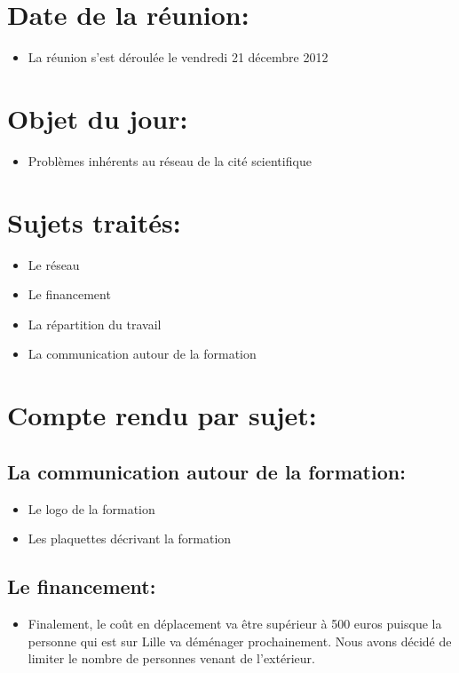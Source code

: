 \section{Date de la réunion:}
\begin{itemize}
\item La réunion s'est déroulée le vendredi 21 décembre 2012
\end{itemize}

\section{Objet du jour:}
\begin{itemize}
\item Problèmes inhérents au réseau de la cité scientifique
\end{itemize}

\section{Sujets traités:}
\begin{itemize}
\item Le réseau
\item Le financement
\item La répartition du travail
\item La communication autour de la formation
\end{itemize}

\section{Compte rendu par sujet:}

\subsection{La communication autour de la formation:}
\begin{itemize}
\item Le logo de la formation
\item Les plaquettes décrivant la formation

\end{itemize}

\subsection{Le financement:}
\begin{itemize}
\item Finalement, le coût en déplacement va être supérieur à 500 euros
puisque la personne qui est sur Lille va déménager prochainement. Nous
avons décidé de limiter le nombre de personnes venant de l'extérieur.
\end{itemize}

